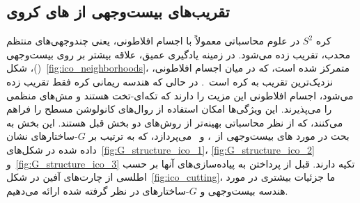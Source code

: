 

\subsection{تقریب‌های بیست‌وجهی از های کروی}
\label{sec:spherical_CNNs_icosahedral}

کره $S^2$ در علوم محاسباتی معمولاً با اجسام افلاطونی، یعنی چندوجهی‌های منتظم محدب، تقریب زده می‌شود.
در زمینه یادگیری عمیق، علاقه بیشتر بر روی بیست‌وجهی ()، شکل~\ref{fig:ico_neighborhoods}، متمرکز شده است، که در میان اجسام افلاطونی، نزدیک‌ترین تقریب به کره است~\cite{schroder1995spherical}.
در حالی که هندسه ریمانی کره فقط تقریب زده می‌شود، اجسام افلاطونی این مزیت را دارند که تکه‌ای-تخت هستند و مش‌های منظمی را می‌پذیرند.
این ویژگی‌ها امکان استفاده از روال‌های کانولوشن مسطح را فراهم می‌کنند، که از نظر محاسباتی بهینه‌تر از روش‌های دو بخش قبل هستند.
این بخش به بحث در مورد های بیست‌وجهی از~\cite{liu2018icoAltAz}، \cite{zhang2019orientation} و~\cite{gaugeIco2019} می‌پردازد، که به ترتیب بر $G$-ساختارهای نشان داده شده در شکل‌های~\ref{fig:G_structure_ico_1}، \ref{fig:G_structure_ico_2} و~\ref{fig:G_structure_ico_3} تکیه دارند.
قبل از پرداختن به پیاده‌سازی‌های آنها بر حسب اطلسی از چارت‌های آفين در شکل~\ref{fig:ico_cutting}،
ما جزئیات بیشتری در مورد هندسه بیست‌وجهی و $G$-ساختارهای در نظر گرفته شده ارائه می‌دهیم.


